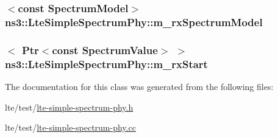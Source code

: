 \subsubsection[{\texorpdfstring{m\+\_\+rx\+Spectrum\+Model}{m_rxSpectrumModel}}]{$<$const {\bf Spectrum\+Model}$>$ ns3\+::\+Lte\+Simple\+Spectrum\+Phy\+::m\+\_\+rx\+Spectrum\+Model\hspace{0.3cm}{\ttfamily [private]}}\hypertarget{classns3_1_1LteSimpleSpectrumPhy_aa5236d4951e4205e8d97f8599f58631f}{}\label{classns3_1_1LteSimpleSpectrumPhy_aa5236d4951e4205e8d97f8599f58631f}
\subsubsection[{\texorpdfstring{m\+\_\+rx\+Start}{m_rxStart}}]{$<$ {\bf Ptr}$<$const {\bf Spectrum\+Value}$>$ $>$ ns3\+::\+Lte\+Simple\+Spectrum\+Phy\+::m\+\_\+rx\+Start\hspace{0.3cm}{\ttfamily [private]}}\hypertarget{classns3_1_1LteSimpleSpectrumPhy_a62dd25ce9f68081bdf7f5d8f20c834a3}{}\label{classns3_1_1LteSimpleSpectrumPhy_a62dd25ce9f68081bdf7f5d8f20c834a3}


The documentation for this class was generated from the following files\+:\begin{DoxyCompactItemize}
\item 
lte/test/\hyperlink{lte-simple-spectrum-phy_8h}{lte-\/simple-\/spectrum-\/phy.\+h}\item 
lte/test/\hyperlink{lte-simple-spectrum-phy_8cc}{lte-\/simple-\/spectrum-\/phy.\+cc}\end{DoxyCompactItemize}
